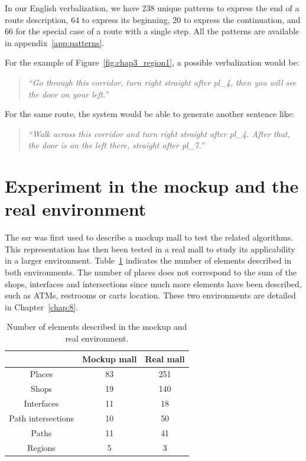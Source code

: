 In our English verbalization, we have 238 unique patterns to express the end of a route description, 64 to express its beginning, 20 to express the continuation, and 66 for the special case of a route with a single step. All the patterns are available in appendix~\ref{app:patterns}.

For the example of Figure~\ref{fig:chap3_region1}, a possible verbalization would be:

\begin{quote} 
\centering 
\textit{
``Go through this corridor, turn right straight after pl\_4, then you will see the door on your left.''}
\end{quote}

For the same route, the system would be able to generate another sentence like:

\begin{quote} 
\centering 
\textit{
``Walk across this corridor and turn right straight after pl\_4. After that, the door is on the left there, straight after pl\_7.''}
\end{quote}

\section{Experiment in the mockup and the real environment}

The \acrshort{ssr} was first used to describe a mockup mall to test the related algorithms. This representation has then been tested in a real mall to study its applicability in a larger environment. Table~\ref{tab:chap3_count} indicates the number of elements described in both environments. The number of places does not correspond to the sum of the shops, interfaces and intersections since much more elements have been described, such as ATMs, restrooms or carts location. These two environments are detailed in Chapter~\ref{chap:8}.

\begin{table}[!ht]
\begin{center}
   \begin{tabular}{ | c || c | c | }
     \hline
                        & Mockup mall & Real mall \\ \hline \hline
     Places             & 83            & 251   \\ \hline
     Shops              & 19            & 140   \\ \hline
     Interfaces         & 11            & 18    \\ \hline
     Path intersections & 10            & 50    \\ \hline
     Paths              & 11            & 41    \\ \hline
     Regions            & 5             & 3     \\
     \hline
   \end{tabular}
 \end{center}
 \caption{\label{tab:chap3_count} Number of elements described in the mockup and real environment.}
\end{table}

